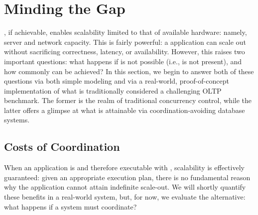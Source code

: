 
\section{Minding the Gap}
\label{sec:evaluation}

\cfreedom, if achievable, enables scalability limited to that of
available hardware: namely, server and network capacity. This is
fairly powerful: a \cfree application can scale out without
sacrificing correctness, latency, or availability. However, this
raises two important questions: what happens if \cfreedom is not
possible (i.e., \iconfluence is not present), and how commonly can
\cfreedom be achieved? In this section, we begin to answer both of
these questions via both simple modeling and via a real-world,
proof-of-concept implementation of what is traditionally considered a
challenging OLTP benchmark. The former is the realm of traditional
concurrency control, while the latter offers a glimpse at what is
attainable via coordination-avoiding database systems.

\subsection{Costs of Coordination}

When an application is \iconfluent and therefore executable with
\cfreedom, scalability is effectively guaranteed: given an appropriate
execution plan, there is no fundamental reason why the application
cannot attain indefinite scale-out. We will shortly quantify these
benefits in a real-world system, but, for now, we evaluate the
alternative: what happens if a system must coordinate?

